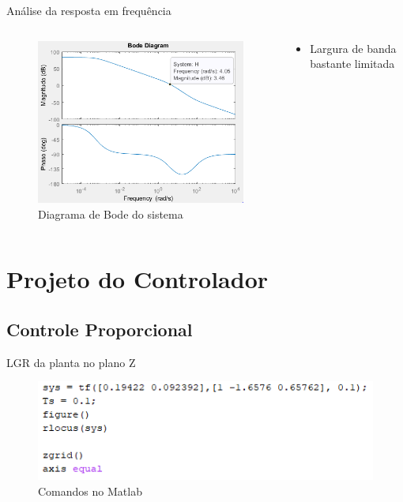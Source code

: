 \documentclass{beamer}
\begin{document}
\begin{frame}{Análise da resposta em frequência}
\begin{columns}
\begin{column}{0.6\textwidth}  %
\begin{figure}
    \centering
    \includegraphics[width = 1.1\linewidth]{src/tex/img/bode.PNG}
    \caption{Diagrama de Bode do sistema}
\end{figure}
\end{column}
\begin{column}{0.4\textwidth}
\begin{itemize}
    \item Largura de banda bastante limitada
\end{itemize}
\end{column}
\end{columns}
\end{frame}

\section{Projeto do Controlador}
\subsection{Controle Proporcional}

\begin{frame}{LGR da planta no plano Z}
\begin{figure}
    \centering
    \includegraphics[width = \linewidth]{src/tex/img/script.PNG}
    \caption{Comandos no Matlab}
    \label{fig:control_1}
\end{figure}
\end{frame}
\end{document}
